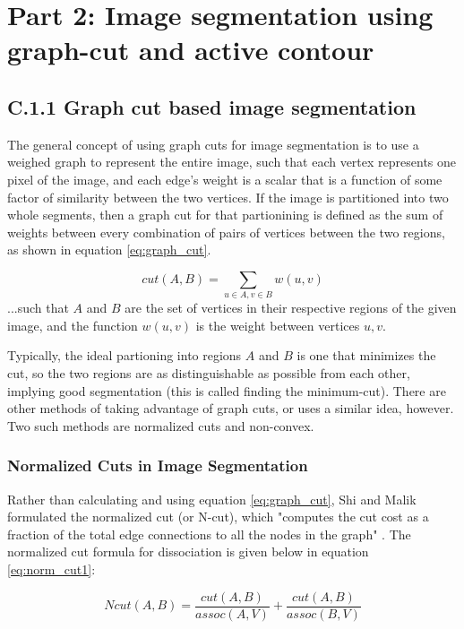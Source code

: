 \documentclass{article}
\begin{document}
\clearpage
\section*{Part 2: Image segmentation using graph-cut and active contour}

\subsection*{C.1.1 Graph cut based image segmentation}

The general concept of using graph cuts for image segmentation is to use a weighed graph to represent the entire image, such that each vertex represents one pixel of the image, and each edge's weight is a scalar that is a function of some factor of similarity between the two vertices. If the image is partitioned into two whole segments, then a graph cut for that partionining is defined as the sum of weights between every combination of pairs of vertices between the two regions, as shown in equation \ref{eq:graph_cut}.

\begin{equation}
cut(A,B) = \sum_{u\in A,v\in B} w(u,v)
\label{eq:graph_cut}
\end{equation}
...such that $A$ and $B$ are the set of vertices in their respective regions of the given image, and the function $w(u,v)$ is the weight between vertices $u,v$.

Typically, the ideal partioning into regions $A$ and $B$ is one that minimizes the cut, so the two regions are as distinguishable as possible from each other, implying good segmentation (this is called finding the minimum-cut). There are other methods of taking advantage of graph cuts, or uses a similar idea, however. Two such methods are normalized cuts and non-convex.



\subsubsection*{Normalized Cuts in Image Segmentation}

Rather than calculating and using equation \ref{eq:graph_cut}, Shi and Malik formulated the normalized cut (or N-cut), which "computes the cut cost as a fraction of the total edge connections to all the nodes in the graph" \cite{ncut}. The normalized cut formula for dissociation is given below in equation \ref{eq:norm_cut1}: \cite{ncut}

\begin{equation}
Ncut(A,B) = \frac{cut(A,B)}{assoc(A,V)} + \frac{cut(A,B)}{assoc(B,V)}
\label{eq:norm_cut1}
\end{equation}
\end{document}

